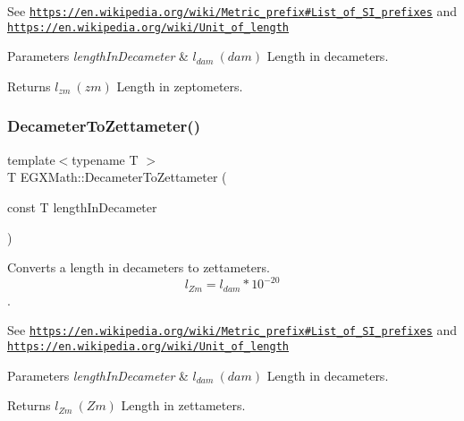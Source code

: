 See \href{https://en.wikipedia.org/wiki/Metric_prefix#List_of_SI_prefixes}{\tt https\+://en.\+wikipedia.\+org/wiki/\+Metric\+\_\+prefix\#\+List\+\_\+of\+\_\+\+S\+I\+\_\+prefixes} and \href{https://en.wikipedia.org/wiki/Unit_of_length}{\tt https\+://en.\+wikipedia.\+org/wiki/\+Unit\+\_\+of\+\_\+length} 
\begin{DoxyParams}{Parameters}
{\em length\+In\+Decameter} & $ l_{dam}\ (dam)$ Length in decameters. \\
\hline
\end{DoxyParams}
\begin{DoxyReturn}{Returns}
$ l_{zm}\ (zm)$ Length in zeptometers. 
\end{DoxyReturn}
\mbox{\label{group___e_g_x_math-_conversions-_length_conversions-_s_i-_decameter-_s_i_ga63a6a9ec3ac42c9837818b82b1fdbcbb}} 
\subsubsection{\texorpdfstring{Decameter\+To\+Zettameter()}{DecameterToZettameter()}}
{\footnotesize\ttfamily template$<$typename T $>$ \\
T E\+G\+X\+Math\+::\+Decameter\+To\+Zettameter (\begin{DoxyParamCaption}\item[{const T}]{length\+In\+Decameter }\end{DoxyParamCaption})}



Converts a length in decameters to zettameters. \[ l_{Zm}=l_{dam} * 10^{-20} \]. 

See \href{https://en.wikipedia.org/wiki/Metric_prefix#List_of_SI_prefixes}{\tt https\+://en.\+wikipedia.\+org/wiki/\+Metric\+\_\+prefix\#\+List\+\_\+of\+\_\+\+S\+I\+\_\+prefixes} and \href{https://en.wikipedia.org/wiki/Unit_of_length}{\tt https\+://en.\+wikipedia.\+org/wiki/\+Unit\+\_\+of\+\_\+length} 
\begin{DoxyParams}{Parameters}
{\em length\+In\+Decameter} & $ l_{dam}\ (dam)$ Length in decameters. \\
\hline
\end{DoxyParams}
\begin{DoxyReturn}{Returns}
$ l_{Zm}\ (Zm)$ Length in zettameters. 
\end{DoxyReturn}
